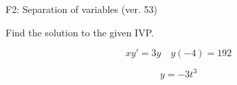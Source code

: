 \begin{exercise}
  \begin{exerciseTitle}F2: Separation of variables (ver. 53)\end{exerciseTitle}
  \begin{exerciseStatement}
    
Find the solution to the given IVP.

    
\[xy'= 3 y \hspace{1em} y( -4 ) = 192\]

  \end{exerciseStatement}
  \begin{exerciseAnswer}
    
\[y= -3 t^ 3\]

  \end{exerciseAnswer}
\end{exercise}